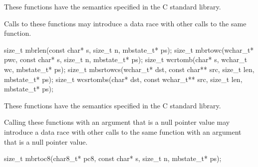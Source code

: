 \begin{itemdescr}
\pnum
\effects
These functions have the semantics specified in the C standard library.

\pnum
\remarks
Calls to these functions
may introduce a data race
with other calls to the same function.
\end{itemdescr}


%
%
%
%
%
\begin{itemdecl}
size_t mbrlen(const char* s, size_t n, mbstate_t* ps);
size_t mbrtowc(wchar_t* pwc, const char* s, size_t n, mbstate_t* ps);
size_t wcrtomb(char* s, wchar_t wc, mbstate_t* ps);
size_t mbsrtowcs(wchar_t* dst, const char** src, size_t len, mbstate_t* ps);
size_t wcsrtombs(char* dst, const wchar_t** src, size_t len, mbstate_t* ps);
\end{itemdecl}

\begin{itemdescr}
\pnum
\effects
These functions have the semantics specified in the C standard library.

\pnum
\remarks
Calling these functions
with an  argument that is a null pointer value
may introduce a data race
with other calls to the same function
with an  argument that is a null pointer value.
\end{itemdescr}


%
\begin{itemdecl}
size_t mbrtoc8(char8_t* pc8, const char* s, size_t n, mbstate_t* ps);
\end{itemdecl}

